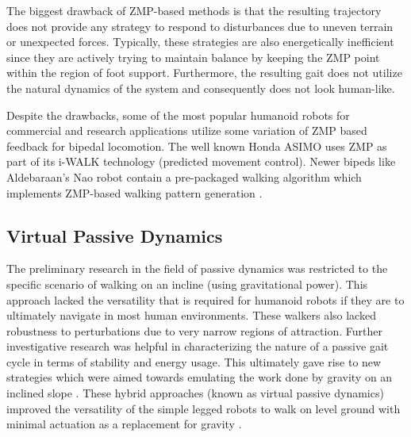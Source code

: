 The biggest drawback of ZMP-based methods is that the resulting trajectory does not provide any strategy to respond to disturbances due to uneven terrain or unexpected forces. Typically, these strategies are also energetically inefficient since they are actively trying to maintain balance by keeping the ZMP point within the region of foot support. Furthermore, the resulting gait does not utilize the natural dynamics of the system and consequently does not look human-like.

Despite the drawbacks, some of the most popular humanoid robots for commercial and research applications utilize some variation of ZMP based feedback for bipedal locomotion. The well known Honda ASIMO \cite{Sakagami:2002cf} uses ZMP as part of its i-WALK technology (predicted movement control). Newer bipeds like Aldebaraan's Nao \cite{Gouaillier2006} robot contain a pre-packaged walking algorithm which implements ZMP-based walking pattern generation \cite{Kajita:2006dx}. 


\subsection{Virtual Passive Dynamics} %
\label{sub:related_passive_dynamics}
The preliminary research in the field of passive dynamics was restricted to the specific scenario of walking on an incline (using  gravitational power). This approach lacked the versatility that is required for humanoid robots if they are to ultimately navigate in most human environments. These walkers also lacked robustness to perturbations due to very narrow regions of attraction. Further investigative research was helpful in characterizing the nature of a passive gait cycle \cite{Goswami:1996gn} in terms of stability and energy usage. This ultimately gave rise to new strategies which were aimed towards emulating the work done by gravity on an inclined slope \cite{Asano:2000wi}. These hybrid approaches (known as virtual passive dynamics) improved the versatility of the simple legged robots to walk on level ground with minimal actuation as a replacement for gravity \cite{Asano:2004tv}. 

